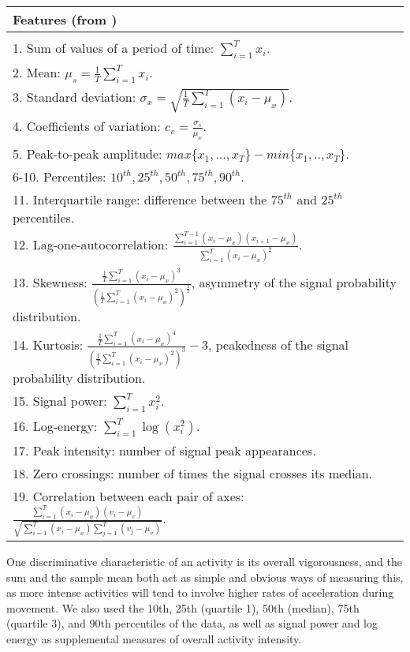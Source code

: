 \vspace{1ex}
\begin{table}[h]
\centering
\begin{tabular}{|p{14cm}|}  \hline
Features (from \cite{zheng13})\\ \hline \\ [-1ex]
1. Sum of values of a period of time: $\sum^T_{i=1} x_i$.\\ [2ex]
2. Mean: $\mu_s = \frac{1}{T} \sum^T_{i=1} x_i$.\\ [2ex]
3. Standard deviation: $\sigma_x = \sqrt{\frac{1}{T} \sum^T_{i=1} (x_i - \mu_x)}$.\\ [2ex]
4. Coefficients of variation: $c_v = \frac{\sigma_s}{\mu_x}$. \\ [2ex]
5. Peak-to-peak amplitude: $max \{x_1, ..., x_T\} - min \{x_1, .., x_T\}$.\\ [2ex]
6-10. Percentiles: $10^{th}, 25^{th}, 50^{th}, 75^{th}, 90^{th}$.\\ [2ex]
11. Interquartile range: difference between the $75^{th}$ and $25^{th}$ percentiles.\\ [2ex]
12. Lag-one-autocorrelation: $\frac{\sum^{T-1}_{i=1} (x_i - \mu_x)(x_{i+1} - \mu_x)}{\sum^T_{i=1} (x_i - \mu_x)^2}$.\\ [2ex]
13. Skewness:
 $\frac{\frac{1}{T} \sum^T_{i=1} (x_i - \mu_x)^3}
{(\frac{1}{T} \sum^T_{i=1} (x_i - \mu_x)^2)^\frac{3}{2}}$,
 asymmetry of the signal probability distribution.\\ [2ex]
14. Kurtosis:
 $\frac{\frac{1}{T} \sum^T_{i=1} (x_i - \mu_x)^4}
{(\frac{1}{T} \sum^T_{i=1} (x_i - \mu_x)^2)^3} - 3$,
 peakedness of the signal probability distribution.\\ [2ex]
15. Signal power: $\sum^T_{i=1} x_i^2$.\\ [2ex]
16. Log-energy: $\sum^T_{i=1} \log(x_i^2)$.\\ [2ex]
17. Peak intensity: number of signal peak appearances.\\ [2ex]
18. Zero crossings: number of times the signal crosses its median.\\ [2ex]
19. Correlation between each pair of axes:
 $\frac{\sum^T_{i=1}(x_i-\mu_x)(v_i-\mu_v)}
{\sqrt{\sum^T_{i=1}(x_i-\mu_x) \sum^T_{j=1}(v_j-\mu_v)}}$.\\ [2ex] \hline
\end{tabular}
\end{table}

One discriminative characteristic of an activity is its overall vigorousness,
and the sum and the sample mean both act as simple and obvious ways of measuring this,
as more intense activities will tend to involve
higher rates of acceleration during movement. We also used the 10th, 25th (quartile 1),
50th (median), 75th (quartile 3), and 90th percentiles of the data, as well as signal
power and log energy as supplemental measures of overall activity intensity.

